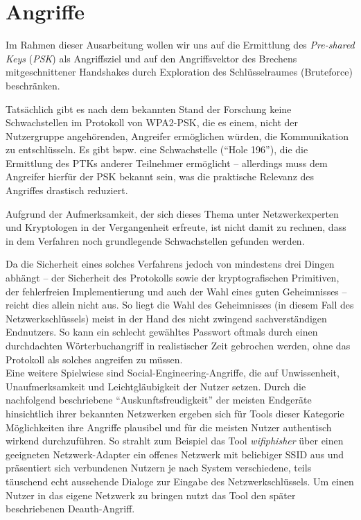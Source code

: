 \section{Angriffe}
Im Rahmen dieser Ausarbeitung wollen wir uns auf die Ermittlung des \textit{Pre-shared Keys} (\textit{PSK}) als Angriffsziel und auf den Angriffsvektor des Brechens mitgeschnittener Handshakes durch Exploration des Schlüsselraumes (Bruteforce) beschränken.

Tatsächlich gibt es nach dem bekannten Stand der Forschung keine Schwachstellen im Protokoll von WPA2-PSK, die es einem, nicht der Nutzergruppe angehörenden, Angreifer ermöglichen würden, die Kommunikation zu entschlüsseln. Es gibt bspw. eine Schwachstelle (\enquote{Hole 196}), die die Ermittlung des PTKs anderer Teilnehmer ermöglicht -- allerdings muss dem Angreifer hierfür der PSK bekannt sein, was die praktische Relevanz des Angriffes drastisch reduziert.

Aufgrund der Aufmerksamkeit, der sich dieses Thema unter Netzwerkexperten und Kryptologen in der Vergangenheit erfreute, ist nicht damit zu rechnen, dass in dem Verfahren noch grundlegende Schwachstellen gefunden werden. 

Da die Sicherheit eines solches Verfahrens jedoch von mindestens drei Dingen abhängt -- der Sicherheit des Protokolls sowie der kryptografischen Primitiven, der fehlerfreien Implementierung und auch der Wahl eines guten Geheimnisses -- reicht dies allein nicht aus. 
So liegt die Wahl des Geheimnisses (in diesem Fall des Netzwerkschlüssels) meist in der Hand des nicht zwingend sachverständigen Endnutzers. 
So kann ein schlecht gewähltes Passwort oftmals durch einen durchdachten Wörterbuchangriff in realistischer Zeit gebrochen werden, ohne das Protokoll als solches angreifen zu müssen.\\

Eine weitere Spielwiese sind Social-Engineering-Angriffe, die auf Unwissenheit, Unaufmerksamkeit und Leichtgläubigkeit der Nutzer setzen. 
Durch die nachfolgend beschriebene \enquote{Auskunftsfreudigkeit} der meisten Endgeräte hinsichtlich ihrer bekannten Netzwerken ergeben sich für Tools dieser Kategorie Möglichkeiten ihre Angriffe plausibel und für die meisten Nutzer authentisch wirkend durchzuführen.
So strahlt zum Beispiel das Tool \textit{wifiphisher} über einen geeigneten Netzwerk-Adapter ein offenes Netzwerk mit beliebiger SSID aus und präsentiert sich verbundenen Nutzern je nach System verschiedene, teils täuschend echt aussehende Dialoge zur Eingabe des Netzwerkschlüssels. 
Um einen Nutzer in das eigene Netzwerk zu bringen nutzt das Tool den später beschriebenen Deauth-Angriff. 

